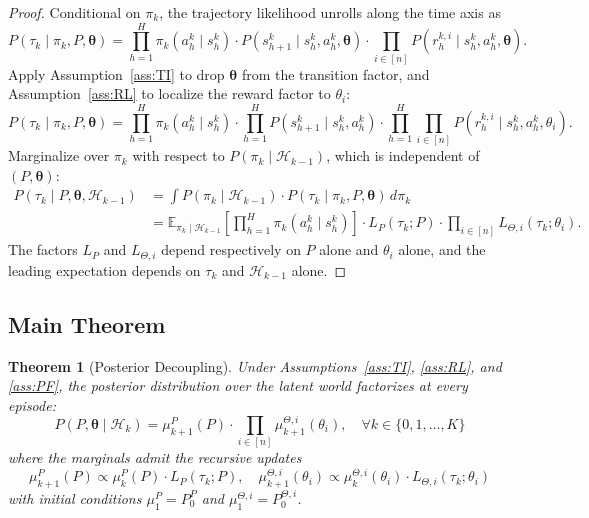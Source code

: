 \documentclass{article}
\newtheorem{theorem}{Theorem}[section]
\begin{document}
\begin{proof}
Conditional on $\pi_k$, the trajectory likelihood unrolls along the time axis as
\begin{equation}
P(\tau_k \mid \pi_k, P, \boldsymbol{\theta}) = \prod_{h=1}^H \pi_k(a_h^k \mid s_h^k) \cdot P(s_{h+1}^k \mid s_h^k, a_h^k, \boldsymbol{\theta}) \cdot \prod_{i \in [n]} P(r_h^{k,i} \mid s_h^k, a_h^k, \boldsymbol{\theta}).
\end{equation}
Apply Assumption~\ref{ass:TI} to drop $\boldsymbol{\theta}$ from the transition factor, and Assumption~\ref{ass:RL} to localize the reward factor to $\theta_i$:
\begin{equation}
P(\tau_k \mid \pi_k, P, \boldsymbol{\theta}) = \prod_{h=1}^H \pi_k(a_h^k \mid s_h^k) \cdot \prod_{h=1}^H P(s_{h+1}^k \mid s_h^k, a_h^k) \cdot \prod_{h=1}^H \prod_{i \in [n]} P(r_h^{k,i} \mid s_h^k, a_h^k, \theta_i).
\end{equation}
Marginalize over $\pi_k$ with respect to $P(\pi_k \mid \mathcal{H}_{k-1})$, which is independent of $(P, \boldsymbol{\theta})$:
\begin{align}
P(\tau_k \mid P, \boldsymbol{\theta}, \mathcal{H}_{k-1}) &= \int P(\pi_k \mid \mathcal{H}_{k-1}) \cdot P(\tau_k \mid \pi_k, P, \boldsymbol{\theta}) \, d\pi_k \\
&= \mathbb{E}_{\pi_k \mid \mathcal{H}_{k-1}}\left[\prod_{h=1}^H \pi_k(a_h^k \mid s_h^k)\right] \cdot L_P(\tau_k; P) \cdot \prod_{i \in [n]} L_{\Theta,i}(\tau_k; \theta_i).
\end{align}
The factors $L_P$ and $L_{\Theta,i}$ depend respectively on $P$ alone and $\theta_i$ alone, and the leading expectation depends on $\tau_k$ and $\mathcal{H}_{k-1}$ alone.
\end{proof}

\subsection{Main Theorem}

\begin{theorem}[Posterior Decoupling]
\label{thm:decoupling}
Under Assumptions~\ref{ass:TI}, \ref{ass:RL}, and \ref{ass:PF}, the posterior distribution over the latent world factorizes at every episode:
\begin{equation}
\label{eq:decoupling}
P(P, \boldsymbol{\theta} \mid \mathcal{H}_k) = \mu_{k+1}^P(P) \cdot \prod_{i \in [n]} \mu_{k+1}^{\Theta,i}(\theta_i), \quad \forall k \in \{0, 1, \ldots, K\}
\end{equation}
where the marginals admit the recursive updates
\begin{equation}
\mu_{k+1}^P(P) \propto \mu_k^P(P) \cdot L_P(\tau_k; P), \quad \mu_{k+1}^{\Theta,i}(\theta_i) \propto \mu_k^{\Theta,i}(\theta_i) \cdot L_{\Theta,i}(\tau_k; \theta_i)
\end{equation}
with initial conditions $\mu_1^P = P_0^P$ and $\mu_1^{\Theta,i} = P_0^{\Theta,i}$.
\end{theorem}
\end{document}
